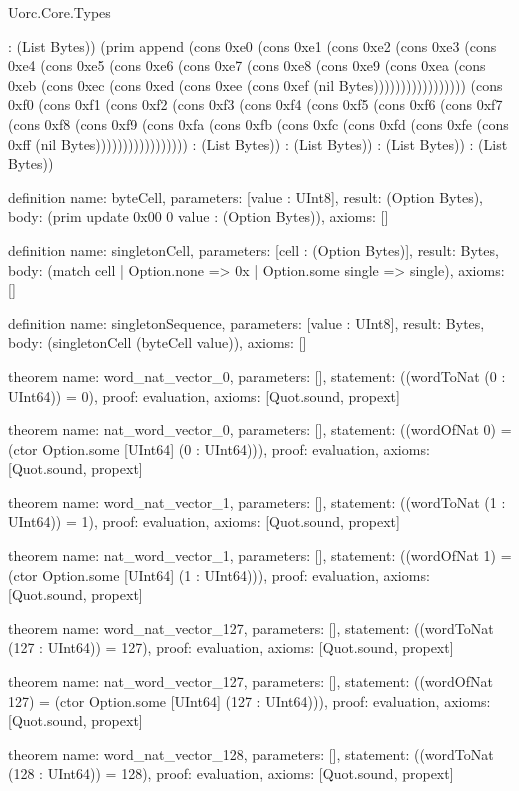 \begin{lexlean}{Uorc.Core.Types}
\begin{semanticmodule}
{: (List Bytes)) (prim append (cons 0xe0 (cons 0xe1 (cons 0xe2 (cons 0xe3 (cons 0xe4 (cons 0xe5 (cons 0xe6 (cons 0xe7 (cons 0xe8 (cons 0xe9 (cons 0xea (cons 0xeb (cons 0xec (cons 0xed (cons 0xee (cons 0xef (nil Bytes))))))))))))))))) (cons 0xf0 (cons 0xf1 (cons 0xf2 (cons 0xf3 (cons 0xf4 (cons 0xf5 (cons 0xf6 (cons 0xf7 (cons 0xf8 (cons 0xf9 (cons 0xfa (cons 0xfb (cons 0xfc (cons 0xfd (cons 0xfe (cons 0xff (nil Bytes))))))))))))))))) : (List Bytes)) : (List Bytes)) : (List Bytes)) : (List Bytes))
}

definition{
  name: byteCell,
  parameters: [value : UInt8],
  result: (Option Bytes),
  body: (prim update 0x00 0 value : (Option Bytes)),
  axioms: []
}

definition{
  name: singletonCell,
  parameters: [cell : (Option Bytes)],
  result: Bytes,
  body: (match cell | Option.none => 0x | Option.some single => single),
  axioms: []
}

definition{
  name: singletonSequence,
  parameters: [value : UInt8],
  result: Bytes,
  body: (singletonCell (byteCell value)),
  axioms: []
}

theorem{
  name: word_nat_vector_0,
  parameters: [],
  statement: ((wordToNat (0 : UInt64)) = 0),
  proof: evaluation{},
  axioms: [Quot.sound, propext]
}

theorem{
  name: nat_word_vector_0,
  parameters: [],
  statement: ((wordOfNat 0) = (ctor Option.some [UInt64] (0 : UInt64))),
  proof: evaluation{},
  axioms: [Quot.sound, propext]
}

theorem{
  name: word_nat_vector_1,
  parameters: [],
  statement: ((wordToNat (1 : UInt64)) = 1),
  proof: evaluation{},
  axioms: [Quot.sound, propext]
}

theorem{
  name: nat_word_vector_1,
  parameters: [],
  statement: ((wordOfNat 1) = (ctor Option.some [UInt64] (1 : UInt64))),
  proof: evaluation{},
  axioms: [Quot.sound, propext]
}

theorem{
  name: word_nat_vector_127,
  parameters: [],
  statement: ((wordToNat (127 : UInt64)) = 127),
  proof: evaluation{},
  axioms: [Quot.sound, propext]
}

theorem{
  name: nat_word_vector_127,
  parameters: [],
  statement: ((wordOfNat 127) = (ctor Option.some [UInt64] (127 : UInt64))),
  proof: evaluation{},
  axioms: [Quot.sound, propext]
}

theorem{
  name: word_nat_vector_128,
  parameters: [],
  statement: ((wordToNat (128 : UInt64)) = 128),
  proof: evaluation{},
  axioms: [Quot.sound, propext]
}


\end{semanticmodule}
\end{lexlean}
